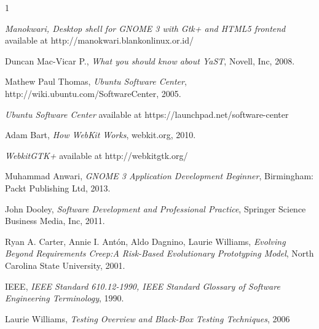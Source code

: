 \documentclass[conference, letterpaper]{IEEEtran}
\begin{document}


%
%
%
\begin{thebibliography}
{1}

\emph{Manokwari, Desktop shell for GNOME 3 with Gtk+ and HTML5 frontend} available at http://manokwari.blankonlinux.or.id/

Duncan Mac-Vicar P., \emph{What you should know about YaST}, Novell, Inc, 2008.

Mathew Paul Thomas, \emph{Ubuntu Software Center}, http://wiki.ubuntu.com/SoftwareCenter, 2005.

\emph{Ubuntu Software Center} available at https://launchpad.net/software-center

Adam Bart, \emph{How WebKit Works}, webkit.org, 2010.

\emph{WebkitGTK+} available at http://webkitgtk.org/

Muhammad Anwari, \emph{GNOME 3 Application Development Beginner}, Birmingham: Packt Publishing Ltd, 2013.

John Dooley, \emph{Software Development and Professional Practice}, Springer Science Business Media, Inc, 2011.

Ryan A. Carter, Annie I. Antón, Aldo Dagnino, Laurie Williams, \emph{Evolving Beyond Requirements Creep:A Risk-Based Evolutionary Prototyping Model}, North Carolina State University, 2001.

IEEE, \emph{IEEE Standard 610.12-1990, IEEE Standard Glossary of Software Engineering Terminology}, 1990.

Laurie Williams, \emph{Testing Overview and Black-Box Testing Techniques}, 2006

\end{thebibliography}

\end{document}
